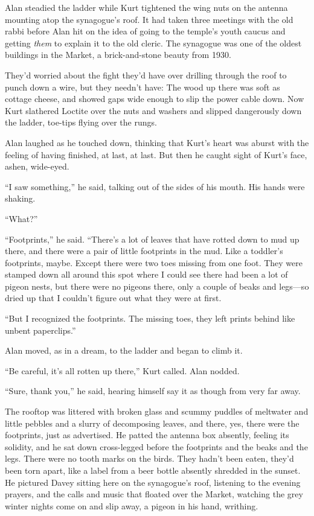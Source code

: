 \documentclass{article}
\begin{document}
Alan steadied the ladder while Kurt tightened the wing nuts on the
antenna mounting atop the synagogue's roof.  It had taken three
meetings with the old rabbi before Alan hit on the idea of going to
the temple's youth caucus and getting \textit{them} to explain it to
the old cleric.  The synagogue was one of the oldest buildings in the
Market, a brick-and-stone beauty from 1930.

They'd worried about the fight they'd have over drilling through the
roof to punch down a wire, but they needn't have:  The wood up there
was soft as cottage cheese, and showed gaps wide enough to slip the
power cable down.  Now Kurt slathered Loctite over the nuts and
washers and slipped dangerously down the ladder, toe-tips flying over
the rungs.

Alan laughed as he touched down, thinking that Kurt's heart was aburst
with the feeling of having finished, at last, at last.  But then he
caught sight of Kurt's face, ashen, wide-eyed.

``I saw something,'' he said, talking out of the sides of his mouth. 
His hands were shaking.

``What?''

``Footprints,'' he said.  ``There's a lot of leaves that have rotted
down to mud up there, and there were a pair of little footprints in
the mud.  Like a toddler's footprints, maybe.  Except there were two
toes missing from one foot.  They were stamped down all around this
spot where I could see there had been a lot of pigeon nests, but there
were no pigeons there, only a couple of beaks and legs---so dried up
that I couldn't figure out what they were at first.

``But I recognized the footprints.  The missing toes, they left prints
behind like unbent paperclips.''

Alan moved, as in a dream, to the ladder and began to climb it.

``Be careful, it's all rotten up there,'' Kurt called.  Alan nodded.

``Sure, thank you,'' he said, hearing himself say it as though from
very far away.

The rooftop was littered with broken glass and scummy puddles of
meltwater and little pebbles and a slurry of decomposing leaves, and
there, yes, there were the footprints, just as advertised.  He patted
the antenna box absently, feeling its solidity, and he sat down
cross-legged before the footprints and the beaks and the legs.  There
were no tooth marks on the birds.  They hadn't been eaten, they'd been
torn apart, like a label from a beer bottle absently shredded in the
sunset.  He pictured Davey sitting here on the synagogue's roof,
listening to the evening prayers, and the calls and music that floated
over the Market, watching the grey winter nights come on and slip
away, a pigeon in his hand, writhing.
\end{document}
